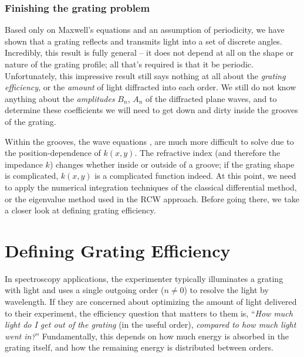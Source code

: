 \subsubsection{Finishing the grating problem}
Based only on Maxwell's equations and an assumption of periodicity, we have shown that a grating reflects and transmits light into a set of discrete angles.  Incredibly, this result is fully general -- it does not depend at all on the shape or nature of the grating profile; all that's required is that it be periodic.  Unfortunately, this impressive result still says nothing at all about the \emph{grating efficiency}, or the \emph{amount} of light diffracted into each order.  We still do not know anything about the \emph{amplitudes} $B_n$, $A_n$ of the diffracted plane waves, and to determine these coefficients we will need to get down and dirty inside the grooves of the grating.

Within the grooves, the wave equations ,  are much more difficult to solve due to the position-dependence of $k(x,y)$.  The refractive index (and therefore the impedance $k$) changes whether inside or outside of a groove; if the grating shape is complicated, $k(x,y)$ is a complicated function indeed.
At this point, we need to apply the numerical integration techniques of the classical differential method, or the eigenvalue method used in the RCW approach.  Before going there, we take a closer look at defining grating efficiency.


\section{Defining Grating Efficiency}
In spectroscopy applications, the experimenter typically illuminates a grating with light and uses a single outgoing order ($n\neq0$) to resolve the light by wavelength.  If they are concerned about optimizing the amount of light delivered to their experiment, the efficiency question that matters to them is, ``\emph{How much light do I get out of the grating} (in the useful order), \emph{compared to how much light went in?}''  Fundamentally, this depends on how much energy is absorbed in the grating itself, and how the remaining energy is distributed between orders.

